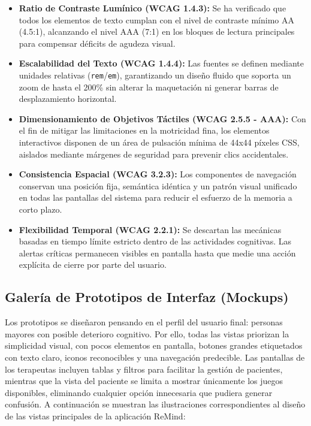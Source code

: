 \begin{itemize}
    \item \textbf{Ratio de Contraste Lumínico (WCAG 1.4.3):} Se ha verificado que todos los elementos de texto cumplan con el nivel de contraste mínimo AA (4.5:1), alcanzando el nivel AAA (7:1) en los bloques de lectura principales para compensar déficits de agudeza visual.
    \item \textbf{Escalabilidad del Texto (WCAG 1.4.4):} Las fuentes se definen mediante unidades relativas (\texttt{rem}/\texttt{em}), garantizando un diseño fluido que soporta un zoom de hasta el 200\% sin alterar la maquetación ni generar barras de desplazamiento horizontal.
    \item \textbf{Dimensionamiento de Objetivos Táctiles (WCAG 2.5.5 - AAA):} Con el fin de mitigar las limitaciones en la motricidad fina, los elementos interactivos disponen de un área de pulsación mínima de 44x44 píxeles CSS, aislados mediante márgenes de seguridad para prevenir clics accidentales.
    \item \textbf{Consistencia Espacial (WCAG 3.2.3):} Los componentes de navegación conservan una posición fija, semántica idéntica y un patrón visual unificado en todas las pantallas del sistema para reducir el esfuerzo de la memoria a corto plazo.
    \item \textbf{Flexibilidad Temporal (WCAG 2.2.1):} Se descartan las mecánicas basadas en tiempo límite estricto dentro de las actividades cognitivas. Las alertas críticas permanecen visibles en pantalla hasta que medie una acción explícita de cierre por parte del usuario.
\end{itemize}

\subsection{Galería de Prototipos de Interfaz (Mockups)}
Los prototipos se diseñaron pensando en el perfil del usuario final: personas mayores con posible deterioro cognitivo. Por ello, todas las vistas priorizan la simplicidad visual, con pocos elementos en pantalla, botones grandes etiquetados con texto claro, iconos reconocibles y una navegación predecible. Las pantallas de los terapeutas incluyen tablas y filtros para facilitar la gestión de pacientes, mientras que la vista del paciente se limita a mostrar únicamente los juegos disponibles, eliminando cualquier opción innecesaria que pudiera generar confusión. A continuación se muestran las ilustraciones correspondientes al diseño de las vistas principales de la aplicación ReMind:

